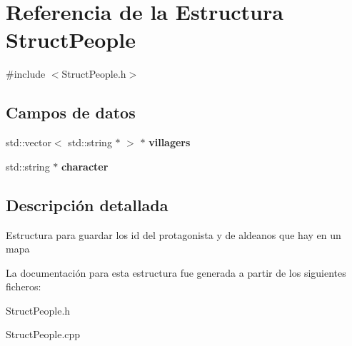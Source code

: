 \hypertarget{structStructPeople}{}\section{Referencia de la Estructura Struct\+People}
\label{structStructPeople}


{\ttfamily \#include $<$Struct\+People.\+h$>$}

\subsection*{Campos de datos}
\begin{DoxyCompactItemize}
\item 
\hypertarget{structStructPeople_a9beb4fd84ea9b068b982a6217847b194}{}std\+::vector$<$ std\+::string $\ast$ $>$ $\ast$ {\bfseries villagers}\label{structStructPeople_a9beb4fd84ea9b068b982a6217847b194}

\item 
\hypertarget{structStructPeople_ae6278812dfcc4a951ebdffec5fb444dd}{}std\+::string $\ast$ {\bfseries character}\label{structStructPeople_ae6278812dfcc4a951ebdffec5fb444dd}

\end{DoxyCompactItemize}


\subsection{Descripción detallada}
Estructura para guardar los id del protagonista y de aldeanos que hay en un mapa 

La documentación para esta estructura fue generada a partir de los siguientes ficheros\+:\begin{DoxyCompactItemize}
\item 
Struct\+People.\+h\item 
Struct\+People.\+cpp\end{DoxyCompactItemize}
